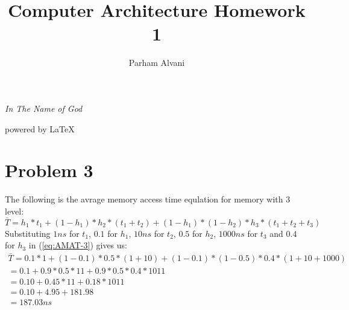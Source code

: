 \documentclass[11pt]{article}
\author{Parham Alvani}
\title{Computer Architecture Homework 1}
\begin{document}
\begin{titlepage}
\begin{center}
\emph{In The Name of God}
\end{center}
\maketitle
\begin{center}
powered by \LaTeX
\end{center}
\end{titlepage}
\tableofcontents
\newpage
\section{Problem 3}
The following is the avrage memory access time equlation for
memory with 3 level:
\begin{equation}
	\label{eq:AMAT-3}
	\bar{T} = h_1 * t_1 + (1 - h_1) * h_2 * (t_1 + t_2) + (1 - h_1) * (1 - h_2) * h_3 * (t_1 + t_2 + t_3)
\end{equation}
Substituting $1ns$ for $t_1$, $0.1$ for $h_1$, $10ns$ for $t_2$, $0.5$ for $h_2$, $1000ns$ for $t_3$ and $0.4$ for $h_3$
in (\ref{eq:AMAT-3}) gives us:
\begin{eqnarray}
	\bar{T} = 0.1 * 1 + (1 - 0.1) * 0.5 * (1 + 10) + (1 - 0.1) * (1 - 0.5) * 0.4 * (1 + 10 + 1000) \\
	= 0.1 + 0.9 * 0.5 * 11 + 0.9 * 0.5 * 0.4 * 1011 \\
	= 0.10 + 0.45 * 11 + 0.18 * 1011 \\
	= 0.10 + 4.95 + 181.98 \\
	= 187.03ns
\end{eqnarray}
\end{document}
